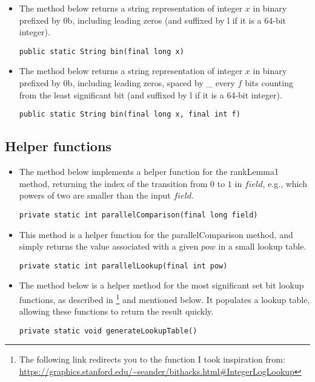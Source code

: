 \begin{itemize}
    \item
    The method below returns a string representation of integer $x$ in binary prefixed by {\ttfamily 0b}, including leading zeros (and suffixed by {\ttfamily l} if it is a 64-bit integer).
    \begin{lstlisting}
public static String bin(final long x)
    \end{lstlisting}
    
    \item
    The method below returns a string representation of integer $x$ in binary prefixed by {\ttfamily 0b}, including leading zeros, spaced by {\ttfamily \_} every $f$ bits counting from the least significant bit (and suffixed by {\ttfamily l} if it is a 64-bit integer).
    \begin{lstlisting}
public static String bin(final long x, final int f)
    \end{lstlisting}
\end{itemize}

\subsection{Helper functions}

\begin{itemize}
    \item
    The method below implements a helper function for the {\ttfamily rankLemma1} method, returning the index of the transition from $0$ to $1$ in $field$, e.g., which powers of two are smaller than the input $field$.
    \begin{lstlisting}
private static int parallelComparison(final long field)
    \end{lstlisting}

    \item
    This method is a helper function for the {\ttfamily parallelComparison} method, and simply returns the value associated with a given $pow$ in a small lookup table.
    \begin{lstlisting}
private static int parallelLookup(final int pow)
    \end{lstlisting}
    
    \item
    The method below is a helper method for the most significant set bit lookup functions, as described in \cite{bittricks}\footnote{The following link redirects you to the function I took inspiration from: \url{https://graphics.stanford.edu/~seander/bithacks.html\#IntegerLogLookup}} and mentioned below. It populates a lookup table, allowing these functions to return the result quickly. 
    \begin{lstlisting}
private static void generateLookupTable()
    \end{lstlisting}
\end{itemize}

